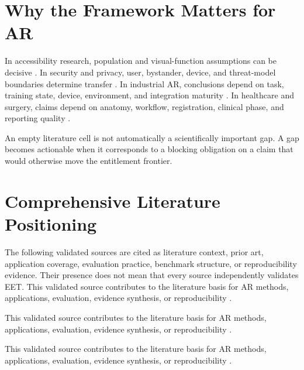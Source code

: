 \documentclass[journal]{IEEEtran}
\begin{document}
\section{Why the Framework Matters for AR}
In accessibility research, population and visual-function assumptions can be decisive \cite{Coughlan2017AR4VI,Huang2019SignReading,Gopalakrishnan2020VisualAcuity,Lang2021ButtonLowVision,Pur2023LowVisionReview}. In security and privacy, user, bystander, device, and threat-model boundaries determine transfer \cite{Cheng2024ARUISecurity,Denning2014Bystanders,OHagan2022EverydayPrivacy,Corbett2023BystandAR,DeGuzman2019SecurityPrivacy}. In industrial AR, conclusions depend on task, training state, device, environment, and integration maturity \cite{Palmarini2018Maintenance,Gattullo2022VisualAssets,Wang2016Assembly,Masood2020IndustrialAdoption,Loizeau2021FieldEvaluation}. In healthcare and surgery, claims depend on anatomy, workflow, registration, clinical phase, and reporting quality \cite{Gsaxner2023HoloLensMedicine,Birlo2022OSTSurgery,Nicolai2026NavigatedSurgery,Yoon2018Surgeon,Vlake2024RATEXR}.

An empty literature cell is not automatically a scientifically important gap. A gap becomes actionable when it corresponds to a blocking obligation on a claim that would otherwise move the entitlement frontier.

\section{Comprehensive Literature Positioning}
The following validated sources are cited as literature context, prior art, application coverage, evaluation practice, benchmark structure, or reproducibility evidence. Their presence does not mean that every source independently validates EET.
This validated source contributes to the literature basis for AR methods, applications, evaluation, evidence synthesis, or reproducibility \cite{Cheng2024ARUISecurity,Baumeister2017CognitiveCost,Lauer2021HMDChildren,Alessa2023Neurophysiological,Kagami2026TagAlong}.

This validated source contributes to the literature basis for AR methods, applications, evaluation, evidence synthesis, or reproducibility \cite{Kanellopoulos2026Diagnosing,Ahmetovic2025Artwork,Chen2026UbiGrip,Cox2025ClinicalAR,Mathew2026ARRAE}.

This validated source contributes to the literature basis for AR methods, applications, evaluation, evidence synthesis, or reproducibility \cite{Pantforder2024DigitalTwinsMR,Sahoo2026LaserProjection,Sheng2024SLAMReview,Zhang2026PoseEstimationReview,Azuma1997Survey}.
\end{document}
